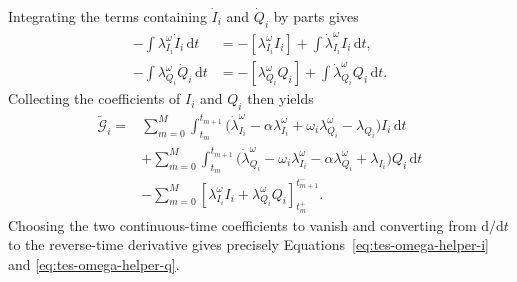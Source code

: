 Integrating the terms containing $\dot I_i$ and $\dot Q_i$ by parts gives
\begin{align}
    -\int\lambda_{I_i}^{\omega}\dot I_i\,\mathrm dt
      &=-[\lambda_{I_i}^{\omega}I_i]
        +\int\dot\lambda_{I_i}^{\omega}I_i\,\mathrm dt,\\
    -\int\lambda_{Q_i}^{\omega}\dot Q_i\,\mathrm dt
      &=-[\lambda_{Q_i}^{\omega}Q_i]
        +\int\dot\lambda_{Q_i}^{\omega}Q_i\,\mathrm dt.
\end{align}
Collecting the coefficients of $I_i$ and $Q_i$ then yields
\begin{align}
    \widetilde{\mathcal G}_i
    ={}&\sum_{m=0}^{M}\int_{t_m}^{t_{m+1}}
      \Big(
        \dot\lambda_{I_i}^{\omega}
        -\alpha\lambda_{I_i}^{\omega}
        +\omega_i\lambda_{Q_i}^{\omega}
        -\lambda_{Q_i}
      \Big)I_i\,\mathrm dt
      \nonumber\\
    &+\sum_{m=0}^{M}\int_{t_m}^{t_{m+1}}
      \Big(
        \dot\lambda_{Q_i}^{\omega}
        -\omega_i\lambda_{I_i}^{\omega}
        -\alpha\lambda_{Q_i}^{\omega}
        +\lambda_{I_i}
      \Big)Q_i\,\mathrm dt
      \nonumber\\
    &-\sum_{m=0}^{M}
      \left[
        \lambda_{I_i}^{\omega}I_i
        +\lambda_{Q_i}^{\omega}Q_i
      \right]_{t_m^+}^{t_{m+1}^-}.
    \label{eq:tes-omega-second-collected}
\end{align}
Choosing the two continuous-time coefficients to vanish and converting from
$\mathrm d/\mathrm dt$ to the reverse-time derivative gives precisely
Equations~\eqref{eq:tes-omega-helper-i} and
\eqref{eq:tes-omega-helper-q}.

